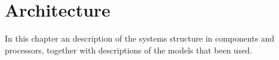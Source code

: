 \chapter{Architecture}
In this chapter an description of the systems structure in components and processors, together
with descriptions of the models that been used.


